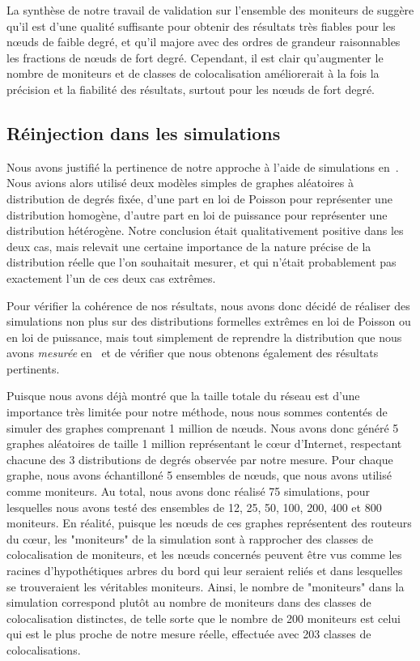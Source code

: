 La synthèse de notre travail de validation sur l'ensemble des moniteurs de
\planetlab suggère qu'il est d'une qualité suffisante pour obtenir des résultats
très fiables pour les n\oe{}uds de faible degré, et qu'il majore avec des ordres de
grandeur raisonnables les fractions de n\oe{}uds de fort degré. Cependant, il est
clair qu'augmenter le nombre de moniteurs et de classes de colocalisation
améliorerait à la fois la précision et la fiabilité des résultats, surtout pour
les n\oe{}uds de fort degré.

\subsection{Réinjection dans les simulations}
\label{subsec:udpping-validation-simuls}

Nous avons justifié la pertinence de notre approche à l'aide de simulations
en~. Nous avions alors utilisé deux modèles simples de
graphes aléatoires à distribution de degrés fixée, d'une part en loi de Poisson
pour représenter une distribution homogène, d'autre part en loi de puissance
pour représenter une distribution hétérogène. Notre conclusion était
qualitativement positive dans les deux cas, mais relevait une certaine
importance de la nature précise de la distribution réelle que l'on souhaitait
mesurer, et qui n'était probablement pas exactement l'un de ces deux cas
extrêmes.

Pour vérifier la cohérence de nos résultats, nous avons donc décidé de réaliser
des simulations non plus sur des distributions formelles extrêmes en loi de
Poisson ou en loi de puissance, mais tout simplement de reprendre la
distribution que nous avons {\em mesurée} en~ et de
vérifier que nous obtenons également des résultats pertinents.

Puisque nous avons déjà montré que la taille totale du réseau est d'une
importance très limitée pour notre méthode, nous nous sommes contentés de
simuler des graphes comprenant 1 million de n\oe{}uds. Nous avons donc généré 5
graphes aléatoires de taille 1 million représentant le c\oe{}ur d'Internet,
respectant chacune des 3 distributions de degrés observée par notre mesure. Pour
chaque graphe, nous avons échantilloné 5 ensembles de n\oe{}uds, que nous avons
utilisé comme moniteurs. Au total, nous avons donc réalisé 75 simulations, pour
lesquelles nous avons testé des ensembles de 12, 25, 50, 100, 200, 400 et 800
moniteurs. En réalité, puisque les n\oe{}uds de ces graphes représentent des
routeurs du c\oe{}ur, les "moniteurs" de la simulation sont à rapprocher des
classes de colocalisation de moniteurs, et les n\oe{}uds concernés peuvent être vus
comme les racines d'hypothétiques arbres du bord qui leur seraient reliés et
dans lesquelles se trouveraient les véritables moniteurs. Ainsi, le nombre de
"moniteurs" dans la simulation correspond plutôt au nombre de moniteurs dans
des classes de colocalisation distinctes, de telle sorte que le nombre de 200
moniteurs est celui qui est le plus proche de notre mesure réelle, effectuée
avec 203 classes de colocalisations.

